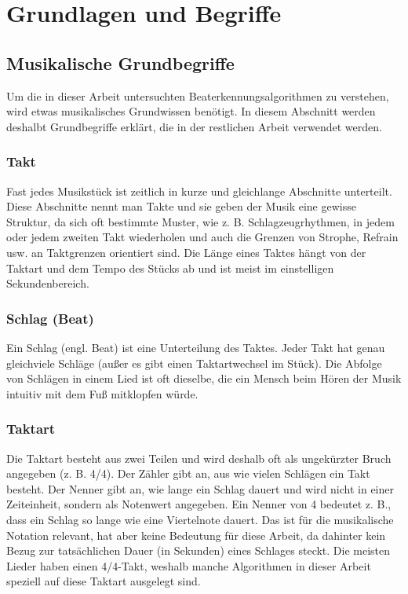 \chapter{Grundlagen und Begriffe}
\label{grundlagen}
\acresetall

\section{Musikalische Grundbegriffe}
{
	Um die in dieser Arbeit untersuchten Beaterkennungsalgorithmen zu verstehen,
		wird etwas musikalisches Grundwissen benötigt.
	In diesem Abschnitt werden deshalbt Grundbegriffe erklärt,
		die in der restlichen Arbeit verwendet werden.

	\subsection{Takt}
	{
		Fast jedes Musikstück ist zeitlich in kurze und gleichlange Abschnitte unterteilt.
		Diese Abschnitte nennt man Takte
			und sie geben der Musik eine gewisse Struktur,
			da sich oft bestimmte Muster, wie z. B. Schlagzeugrhythmen, in jedem oder jedem zweiten Takt wiederholen
			und auch die Grenzen von Strophe, Refrain usw. an Taktgrenzen orientiert sind.
		Die Länge eines Taktes hängt von der Taktart und dem Tempo des Stücks ab
			und ist meist im einstelligen Sekundenbereich.
	}

	\subsection{Schlag (Beat)}
	{
		Ein Schlag (engl. Beat) ist eine Unterteilung des Taktes.
		Jeder Takt hat genau gleichviele Schläge (au{\ss}er es gibt einen Taktartwechsel im Stück).
		Die Abfolge von Schlägen in einem Lied ist oft dieselbe,
			die ein Mensch beim Hören der Musik intuitiv mit dem Fu{\ss} mitklopfen würde.
	}

	\subsection{Taktart}
	{
		Die Taktart besteht aus zwei Teilen
			und wird deshalb oft als ungekürzter Bruch angegeben (z. B. 4/4).
		Der Zähler gibt an,
			aus wie vielen Schlägen ein Takt besteht.
		Der Nenner gibt an,
			wie lange ein Schlag dauert
			und wird nicht in einer Zeiteinheit,
			sondern als Notenwert angegeben.
		Ein Nenner von 4 bedeutet z. B.,
			dass ein Schlag so lange wie eine Viertelnote dauert.
		Das ist für die musikalische Notation relevant,
			hat aber keine Bedeutung für diese Arbeit,
			da dahinter kein Bezug zur tatsächlichen Dauer (in Sekunden) eines Schlages steckt.
		Die meisten Lieder haben einen 4/4-Takt,
			weshalb manche Algorithmen in dieser Arbeit speziell auf diese Taktart ausgelegt sind.
	}

}
